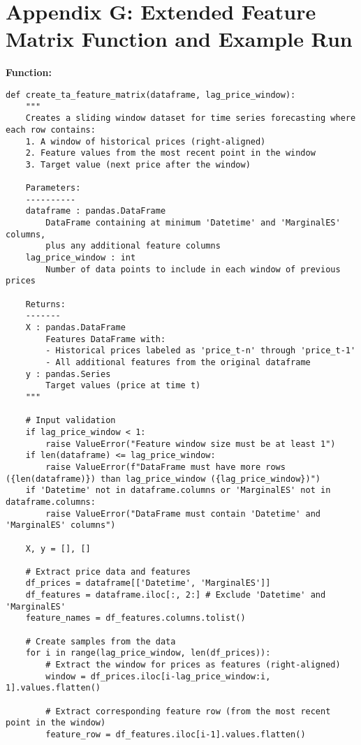 \documentclass[12pt]{report} %
\begin{document}
\chapter* {Appendix G: Extended Feature Matrix Function and Example Run}
\label{app:appendix_g_extended_feature_matrix}

\noindent \textbf{Function:}
\begin{lstlisting}
def create_ta_feature_matrix(dataframe, lag_price_window):
    """
    Creates a sliding window dataset for time series forecasting where each row contains:
    1. A window of historical prices (right-aligned)
    2. Feature values from the most recent point in the window
    3. Target value (next price after the window)
    
    Parameters:
    ----------
    dataframe : pandas.DataFrame
        DataFrame containing at minimum 'Datetime' and 'MarginalES' columns, 
        plus any additional feature columns
    lag_price_window : int
        Number of data points to include in each window of previous prices
        
    Returns:
    -------
    X : pandas.DataFrame
        Features DataFrame with:
        - Historical prices labeled as 'price_t-n' through 'price_t-1'
        - All additional features from the original dataframe
    y : pandas.Series
        Target values (price at time t)
    """
    
    # Input validation
    if lag_price_window < 1:
        raise ValueError("Feature window size must be at least 1")
    if len(dataframe) <= lag_price_window:
        raise ValueError(f"DataFrame must have more rows ({len(dataframe)}) than lag_price_window ({lag_price_window})")
    if 'Datetime' not in dataframe.columns or 'MarginalES' not in dataframe.columns:
        raise ValueError("DataFrame must contain 'Datetime' and 'MarginalES' columns")

    X, y = [], []
    
    # Extract price data and features
    df_prices = dataframe[['Datetime', 'MarginalES']]
    df_features = dataframe.iloc[:, 2:] # Exclude 'Datetime' and 'MarginalES'
    feature_names = df_features.columns.tolist()

    # Create samples from the data
    for i in range(lag_price_window, len(df_prices)):
        # Extract the window for prices as features (right-aligned)
        window = df_prices.iloc[i-lag_price_window:i, 1].values.flatten()
        
        # Extract corresponding feature row (from the most recent point in the window)
        feature_row = df_features.iloc[i-1].values.flatten()


\end{lstlisting}
\end{document}
